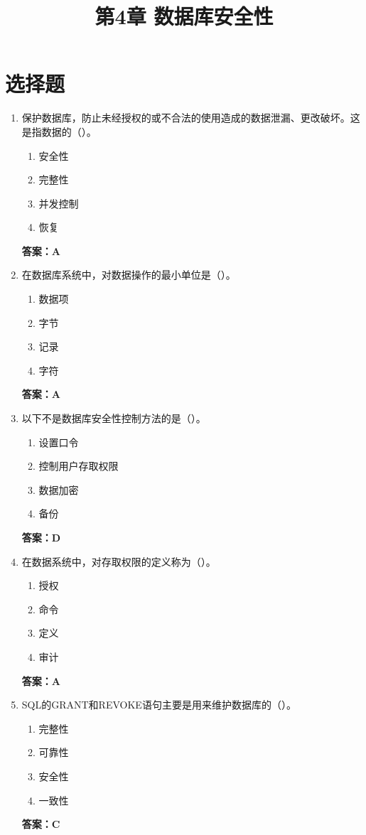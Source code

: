 \documentclass[12pt, a4paper]{article}
\title{\textbf{第4章 数据库安全性}}
\date{}
\begin{document}
\section{选择题}

\begin{enumerate}[label=\arabic*.]
	\item 保护数据库，防止未经授权的或不合法的使用造成的数据泄漏、更改破坏。这是指数据的（\quad）。
	      \begin{enumerate}
		      \item 安全性
		      \item 完整性
		      \item 并发控制
		      \item 恢复
	      \end{enumerate}
	      \textbf{答案：A}

	\item 在数据库系统中，对数据操作的最小单位是（\quad）。
	      \begin{enumerate}
		      \item 数据项
		      \item 字节
		      \item 记录
		      \item 字符
	      \end{enumerate}
	      \textbf{答案：A}

	\item 以下不是数据库安全性控制方法的是（\quad）。
	      \begin{enumerate}
		      \item 设置口令
		      \item 控制用户存取权限
		      \item 数据加密
		      \item 备份
	      \end{enumerate}
	      \textbf{答案：D}

	\item 在数据系统中，对存取权限的定义称为（\quad）。
	      \begin{enumerate}
		      \item 授权
		      \item 命令
		      \item 定义
		      \item 审计
	      \end{enumerate}
	      \textbf{答案：A}

	\item SQL的GRANT和REVOKE语句主要是用来维护数据库的（\quad）。
	      \begin{enumerate}
		      \item 完整性
		      \item 可靠性
		      \item 安全性
		      \item 一致性
	      \end{enumerate}
	      \textbf{答案：C}


\end{enumerate}
\end{document}
